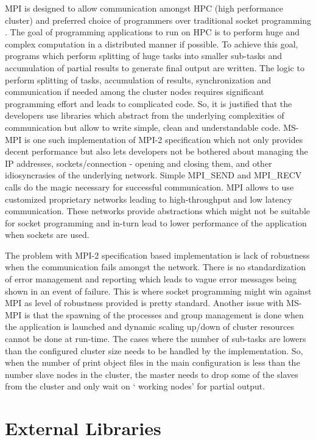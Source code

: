 MPI is designed to allow communication amongst HPC (high performance cluster) and preferred choice of programmers over traditional socket programming \cite{mpivssock}. The goal of programming applications to run on HPC is to perform huge and complex computation in a distributed manner if possible. To achieve this goal, programs which perform splitting of huge tasks into smaller sub-tasks and accumulation of partial results to generate final output are written. The logic to perform splitting of tasks, accumulation of results, synchronization and communication if needed among the cluster nodes requires significant programming effort and leads to complicated code. So, it is justified that the developers use libraries which abstract from the underlying complexities of communication but allow to write simple, clean and understandable code. MS-MPI is one such implementation of MPI-2 specification which not only provides decent performance but also lets developers not be bothered about managing the IP addresses, sockets/connection - opening and closing them, and other idiosyncrasies of the underlying network. Simple MPI\_SEND and MPI\_RECV calls do the magic necessary for successful communication. MPI allows to use customized proprietary networks leading to high-throughput and low latency communication. These networks provide abstractions which might not be suitable for socket programming and in-turn lead to lower performance of the application when sockets are used. \newline          

The problem with MPI-2 specification based implementation is lack of robustness when the communication fails amongst the network. There is no standardization of error management and reporting which leads to vague error messages being shown in an event of failure. This is where socket programming might win against MPI as level of robustness provided is pretty standard. Another issue with MS-MPI is that the spawning of the processes and group management is done when the application is launched and dynamic scaling up/down of cluster resources cannot be done at run-time. The cases where the number of sub-tasks are lowers than the configured cluster size needs to be handled by the implementation. So, when the number of print object files in the main configuration is less than the number slave nodes in the cluster, the master needs to drop some of the slaves from the cluster and only wait on {\lq} working nodes{\rq} for partial output. 
	
\section{External Libraries}

